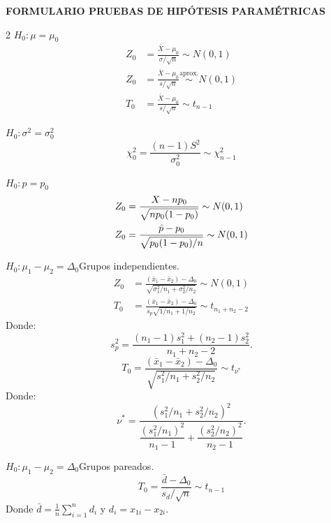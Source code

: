 \documentclass[letterpaper,10pt]{article}
\begin{document}
\begin{center}\normalsize\bfseries FORMULARIO PRUEBAS DE HIPÓTESIS PARAMÉTRICAS\end{center}
\vspace{-0.35cm}
\begin{multicols}{2}
\fontsize{10.4}{13.4}\selectfont
\raggedcolumns
\textbf{$H_0:\mu=\mu_0$}
\begin{align}
Z_0&=\frac{\bar X-\mu_0}{\sigma/\sqrt n}\sim N(0,1)\\
Z_0&=\frac{\bar X-\mu_0}{s/\sqrt n}\overset{\mathrm{aprox.}}\sim N(0,1)\\
T_0&=\frac{\bar X-\mu_0}{s/\sqrt n}\sim t_{n-1}
\end{align}
\vspace{23pt}\par\textbf{$H_0:\sigma^2=\sigma_0^2$}
\begin{equation}\chi_0^2=\frac{(n-1)S^2}{\sigma_0^2}\sim\chi^2_{n-1}\end{equation}
\vspace{23pt}\par\textbf{$H_0:p=p_0$}
\begin{align}
Z_0&=\frac{X-np_0}{\sqrt{np_0(1-p_0)}}\sim N(0,1)\\
Z_0&=\frac{\hat p-p_0}{\sqrt{p_0(1-p_0)/n}}\sim N(0,1)\notag
\end{align}
\vspace{23pt}\par\textbf{$H_0:\mu_1-\mu_2=\Delta_0$}\quad Grupos independientes.
\begin{align}
Z_0&=\frac{(\bar x_1-\bar x_2)-\Delta_0}{\sqrt{\sigma_1^2/n_1+\sigma_2^2/n_2}}\sim N(0,1)\\
T_0&=\frac{(\bar x_1-\bar x_2)-\Delta_0}{s_p\sqrt{1/n_1+1/n_2}}\sim t_{n_1+n_2-2}
\end{align}
Donde:
\[s_p^2=\frac{(n_1-1)s_1^2+(n_2-1)s_2^2}{n_1+n_2-2}.\]
\begin{equation}
T_0=\frac{(\bar x_1-\bar x_2)-\Delta_0}{\sqrt{s_1^2/n_1+s_2^2/n_2}}\sim t_{\nu^*}
\end{equation}
Donde:
\[\nu^*=\frac{(s_1^2/n_1+s_2^2/n_2)^2}{\dfrac{(s_1^2/n_1)^2}{n_1-1}+\dfrac{(s_2^2/n_2)^2}{n_2-1}}.\]
\vspace{23pt}\par\textbf{$H_0:\mu_1-\mu_2=\Delta_0$}\quad Grupos pareados.
\begin{equation}
T_0=\frac{\bar d-\Delta_0}{s_d/\sqrt n}\sim t_{n-1}
\end{equation}
Donde $\bar d=\frac1n\sum_{i=1}^n d_i$ y $d_i=x_{1i}-x_{2i}$.


\end{multicols}
\end{document}
